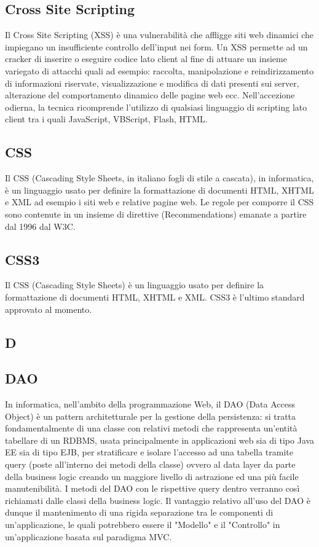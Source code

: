 \subsection*{Cross Site Scripting}
Il Cross Site Scripting (XSS) è una vulnerabilità che affligge siti web dinamici che impiegano un insufficiente controllo dell'input nei form. Un XSS permette ad un cracker di inserire o eseguire codice lato client al fine di attuare un insieme variegato di attacchi quali ad esempio: raccolta, manipolazione e reindirizzamento di informazioni riservate, visualizzazione e modifica di dati presenti sui server, alterazione del comportamento dinamico delle pagine web ecc. Nell'accezione odierna, la tecnica ricomprende l'utilizzo di qualsiasi linguaggio di scripting lato client tra i quali JavaScript, VBScript, Flash, HTML.

\subsection*{CSS}
Il CSS (Cascading Style Sheets, in italiano fogli di stile a cascata), in informatica, è un linguaggio usato per definire la formattazione di documenti HTML, XHTML e XML ad esempio i siti web e relative pagine web. Le regole per comporre il CSS sono contenute in un insieme di direttive (Recommendations) emanate a partire dal 1996 dal W3C.

\subsection*{CSS3}
Il CSS (Cascading Style Sheets) è un linguaggio usato per definire la formattazione di documenti HTML, XHTML e XML.
CSS3 è l'ultimo standard approvato al momento.

\newpage

\begin{center}
\Huge\section*{\uppercase{D}}
\end{center}

\subsection*{DAO}
In informatica, nell'ambito della programmazione Web, il DAO (Data Access Object) è un pattern architetturale per la gestione della persistenza: si tratta fondamentalmente di una classe con relativi metodi che rappresenta un'entità tabellare di un RDBMS, usata principalmente in applicazioni web sia di tipo Java EE sia di tipo EJB, per stratificare e isolare l'accesso ad una tabella tramite query (poste all'interno dei metodi della classe) ovvero al data layer da parte della business logic creando un maggiore livello di astrazione ed una più facile manutenibilità. I metodi del DAO con le rispettive query dentro verranno così richiamati dalle classi della business logic. Il vantaggio relativo all'uso del DAO è dunque il mantenimento di una rigida separazione tra le componenti di un'applicazione, le quali potrebbero essere il "Modello" e il "Controllo" in un'applicazione basata sul paradigma MVC.

